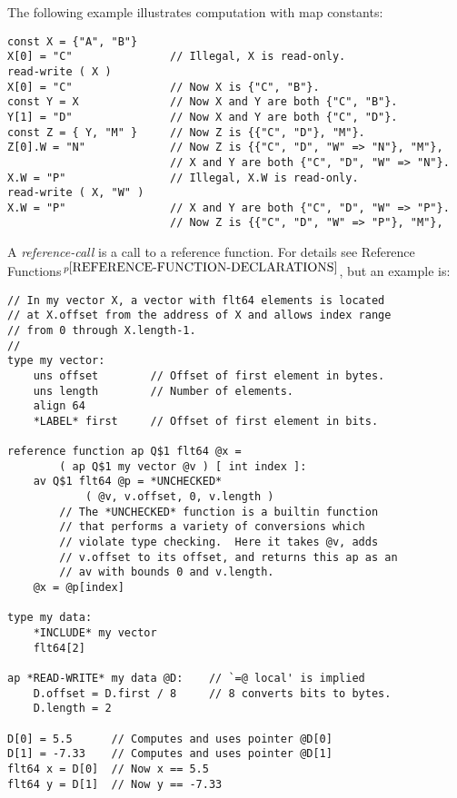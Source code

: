\documentclass[12pt]{article}
\newcommand{\pagnote}[1]{$\,^{p\pageref{#1}}$}
\newenvironment{indpar}[1][0.3in]%
	{\begin{list}{}%
		     {\setlength{\itemsep}{0in}%
		      \setlength{\topsep}{0in}%
		      \setlength{\parsep}{1ex}%
		      \setlength{\labelwidth}{#1}%
		      \setlength{\leftmargin}{#1}%
		      \addtolength{\leftmargin}{\labelsep}}%
	 \item}%
	{\end{list}}
\begin{document}
The following example illustrates
computation with map constants:
\begin{indpar}\begin{verbatim}
const X = {"A", "B"}
X[0] = "C"               // Illegal, X is read-only.
read-write ( X )
X[0] = "C"               // Now X is {"C", "B"}.
const Y = X              // Now X and Y are both {"C", "B"}. 
Y[1] = "D"               // Now X and Y are both {"C", "D"}. 
const Z = { Y, "M" }     // Now Z is {{"C", "D"}, "M"}.
Z[0].W = "N"             // Now Z is {{"C", "D", "W" => "N"}, "M"},
                         // X and Y are both {"C", "D", "W" => "N"}.
X.W = "P"                // Illegal, X.W is read-only.
read-write ( X, "W" )
X.W = "P"                // X and Y are both {"C", "D", "W" => "P"}.
                         // Now Z is {{"C", "D", "W" => "P"}, "M"},
\end{verbatim}\end{indpar}

A {\em reference-call} is a call to a reference function.
For details see Reference Functions\pagnote{REFERENCE-FUNCTION-DECLARATIONS},
but an example is:

\begin{indpar}\label{REFERENCE-FUNCTION-EXAMPLE}\begin{verbatim}
// In my vector X, a vector with flt64 elements is located
// at X.offset from the address of X and allows index range
// from 0 through X.length-1.
//
type my vector:
    uns offset        // Offset of first element in bytes.
    uns length        // Number of elements.
    align 64
    *LABEL* first     // Offset of first element in bits.

reference function ap Q$1 flt64 @x =
        ( ap Q$1 my vector @v ) [ int index ]:
    av Q$1 flt64 @p = *UNCHECKED*
            ( @v, v.offset, 0, v.length )
        // The *UNCHECKED* function is a builtin function
        // that performs a variety of conversions which
        // violate type checking.  Here it takes @v, adds
        // v.offset to its offset, and returns this ap as an
        // av with bounds 0 and v.length.
    @x = @p[index]

type my data:
    *INCLUDE* my vector
    flt64[2]

ap *READ-WRITE* my data @D:    // `=@ local' is implied
    D.offset = D.first / 8     // 8 converts bits to bytes.
    D.length = 2

D[0] = 5.5      // Computes and uses pointer @D[0]
D[1] = -7.33    // Computes and uses pointer @D[1]
flt64 x = D[0]  // Now x == 5.5
flt64 y = D[1]  // Now y == -7.33
\end{verbatim}\end{indpar}
\end{document}
